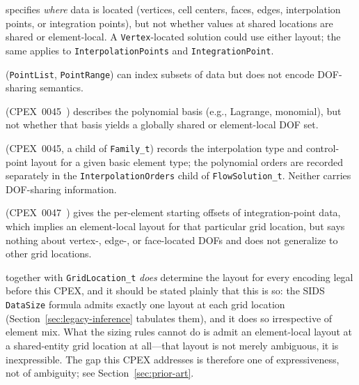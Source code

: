 \documentclass[11pt,letterpaper]{article}
\begin{document}
\begin{description}[leftmargin=2em]
\item[\texttt{GridLocation\_t}] specifies \emph{where} data is
  located (vertices, cell centers, faces, edges, interpolation
  points, or integration points), but not whether values at shared
  locations are shared or element-local.  A \texttt{Vertex}-located
  solution could use either layout; the same applies to
  \texttt{InterpolationPoints} and \texttt{IntegrationPoint}.

\item[\texttt{PointSet}] (\texttt{PointList}, \texttt{PointRange})
  can index subsets of data but does not encode DOF-sharing semantics.

\item[\texttt{InterpolationType\_t}] (CPEX~0045~\cite{cpex0045})
  describes the polynomial basis (e.g., Lagrange, monomial), but not
  whether that basis yields a globally shared or element-local DOF set.

\item[\texttt{SolutionInterpolation\_t}] (CPEX~0045, a child of
  \texttt{Family\_t}) records the interpolation type and control-point
  layout for a given basic element type; the polynomial orders are
  recorded separately in the \texttt{InterpolationOrders} child of
  \texttt{FlowSolution\_t}.  Neither carries DOF-sharing information.

\item[\texttt{ItgPointsStartOffset}] (CPEX~0047~\cite{cpex0047})
  gives the per-element starting offsets of integration-point data, which
  implies an element-local layout for that particular grid location, but
  says nothing about vertex-, edge-, or face-located DOFs and does not
  generalize to other grid locations.

\item[Data array size] together with \texttt{GridLocation\_t}
  \emph{does} determine the layout for every encoding legal before this
  CPEX, and it should be stated plainly that this is so: the SIDS
  \texttt{DataSize} formula admits exactly one layout at each grid
  location (Section~\ref{sec:legacy-inference} tabulates them), and it
  does so irrespective of element mix.  What the sizing rules cannot do
  is admit an element-local layout at a shared-entity grid location at
  all---that layout is not merely ambiguous, it is inexpressible.  The
  gap this CPEX addresses is therefore one of expressiveness, not of
  ambiguity; see Section~\ref{sec:prior-art}.
\end{description}
\end{document}
